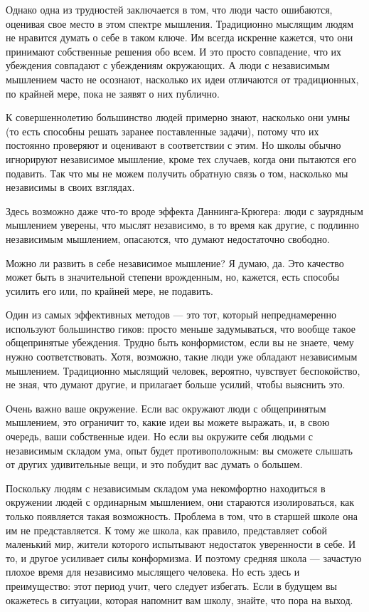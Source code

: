 \documentclass[ebook,12pt,oneside,openany]{memoir}
\begin{document}
Однако одна из трудностей заключается в том, что люди часто ошибаются,
оценивая свое место в этом спектре мышления. Традиционно мыслящим
людям не нравится думать о себе в таком ключе. Им всегда искренне
кажется, что они принимают собственные решения обо всем. И это просто
совпадение, что их убеждения совпадают с убеждениям окружающих. А люди
с независимым мышлением часто не осознают, насколько их идеи
отличаются от традиционных, по крайней мере, пока не заявят о них
публично.

К совершеннолетию большинство людей примерно знают, насколько они умны
(то есть способны решать заранее поставленные задачи), потому что их
постоянно проверяют и оценивают в соответствии с этим. Но школы обычно
игнорируют независимое мышление, кроме тех случаев, когда они пытаются
его подавить. Так что мы не можем получить обратную связь о том,
насколько мы независимы в своих взглядах.

Здесь возможно даже что-то вроде эффекта Даннинга-Крюгера: люди с
заурядным мышлением уверены, что мыслят независимо, в то время как
другие, с подлинно независимым мышлением, опасаются, что думают
недостаточно свободно.

Можно ли развить в себе независимое мышление? Я думаю, да. Это
качество может быть в значительной степени врожденным, но, кажется,
есть способы усилить его или, по крайней мере, не подавить.

Один из самых эффективных методов — это тот, который непреднамеренно
используют большинство гиков: просто меньше задумываться, что вообще
такое общепринятые убеждения. Трудно быть конформистом, если вы не
знаете, чему нужно соответствовать. Хотя, возможно, такие люди уже
обладают независимым мышлением. Традиционно мыслящий человек,
вероятно, чувствует беспокойство, не зная, что думают другие, и
прилагает больше усилий, чтобы выяснить это.

Очень важно ваше окружение. Если вас окружают люди с общепринятым
мышлением, это ограничит то, какие идеи вы можете выражать, и, в свою
очередь, ваши собственные идеи. Но если вы окружите себя людьми с
независимым складом ума, опыт будет противоположным: вы сможете
слышать от других удивительные вещи, и это побудит вас думать о
большем.

Поскольку людям с независимым складом ума некомфортно находиться в
окружении людей с ординарным мышлением, они стараются изолироваться,
как только появляется такая возможность. Проблема в том, что в старшей
школе она им не представляется. К тому же школа, как правило,
представляет собой маленький мир, жители которого испытывают
недостаток уверенности в себе. И то, и другое усиливает силы
конформизма. И поэтому средняя школа — зачастую плохое время для
независимо мыслящего человека. Но есть здесь и преимущество: этот
период учит, чего следует избегать. Если в будущем вы окажетесь в
ситуации, которая напомнит вам школу, знайте, что пора на выход.
\end{document}
